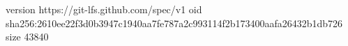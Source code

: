 version https://git-lfs.github.com/spec/v1
oid sha256:2610ee22f3d0b3947c1940aa7fe787a2c993114f2b173400aafa26432b1db726
size 43840
